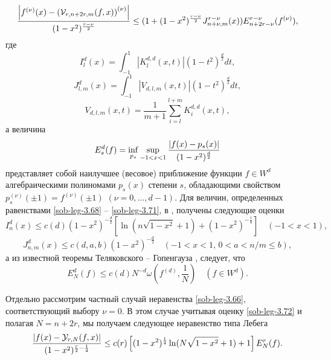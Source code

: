   \begin{equation}\label{sob-leg-3.67}
   {\left|f^{(\nu)}(x)-\left(\mathcal{V }_{r,n+2r,m}(f,x)\right)^{(\nu)}\right|\over(1-x^2)^\frac{r-\nu}{2}}
\le  (1+(1-x^2)^\frac{r-\nu}{2}J^{r-\nu}_{n+\nu,m}(x))
E^{r-\nu}_{n+2r-\nu}(f^{(\nu)}),
\end{equation}
где
\begin{equation}\label{sob-leg-3.68}
I^{d}_{l}(x)= \int_{-1}^{1}|K^{d,d}_{l}(x,t)|(1-t^2)^{\frac{d}{2}}dt,
\end{equation}
\begin{equation}\label{sob-leg-3.69}
J^{d}_{l,m}(x)= \int_{-1}^{1}|V_{d,l,m}(x,t)|(1-t^2)^{\frac{d}{2}}dt,
\end{equation}
\begin{equation}\label{sob-leg-3.70}
V_{d,l,m}(x,t)=\frac{1}{m+1}\sum_{i=l}^{l+m}K^{d,d}_i(x,t),
\end{equation}
а величина
\begin{equation}\label{sob-leg-3.71}
E_s^d(f)=\inf_{p_s}\sup_{-1<x<1}{|f(x)-p_s(x)|\over (1-x^2)^\frac{d}{2}}
\end{equation}
представляет собой наилучшее (весовое) приближение функции $f\in W^d$ алгебраическими полиномами $p_s(x)$ степени
$s$, обладающими свойством $p_s^{(\nu)}(\pm1)=f^{(\nu)}(\pm1)$ $(\nu=0,\ldots, d-1)$. Для величин, определенных равенствами \eqref{sob-leg-3.68} -- \eqref{sob-leg-3.71}, в \cite{sob-leg-Shar15}, \cite{sob-leg-Shar17} получены следующие оценки
\begin{equation}\label{sob-leg-3.72}
I^d_n(x)\le c(d)(1-x^2)^{-\frac{d}{2}}\left[\ln(n\sqrt{1-x^2}+1)+(1-x^2)^{-\frac14}\right]\quad(-1<x<1),
\end{equation}
\begin{equation}\label{sob-leg-3.73}
J^d_{n,m}(x)\le c(d,a,b)(1-x^2)^{-\frac{d}{2}}\quad (-1<x<1,\, 0< a<n/m\le b),
\end{equation}
а из известной теоремы Теляковского -- Гопенгауза \cite{sob-leg-TEL},\cite{sob-leg-GOP} следует, что
\begin{equation}\label{sob-leg-3.74}
E_N^d(f)\le c(d)N^{-d}\omega(f^{(d)},\frac{1}{N})\quad (f\in W^d).
\end{equation}

Отдельно рассмотрим частный случай неравенства \eqref{sob-leg-3.66}, соответствующий выбору $\nu=0$. В этом случае  учитывая оценку \eqref{sob-leg-3.72} и полагая $N=n+2r$, мы получаем следующее неравенство типа Лебега
\begin{equation}\label{sob-leg-3.75}
{\left|f(x)-\mathcal{Y}_{r,N}(f,x)\right|
\over(1-x^2)^{\frac{r}{2}-\frac14}}\le c(r)\left[(1-x^2)^{\frac14}\ln(N\sqrt{1-x^2}+1)+1\right]E^{r}_{N}(f).
  \end{equation}

